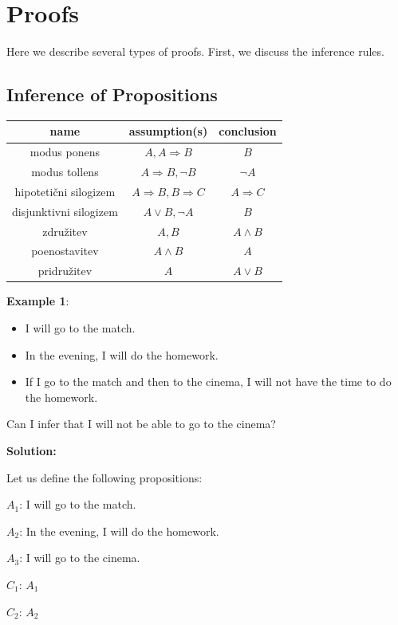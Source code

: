 \documentclass[11pt,paper=b5,footinclude,headinclude]{scrbook} %
\theoremstyle{remark}
\theoremstyle{definition} %
\theoremstyle{theorem} %
\begin{document}
\section{Proofs}
Here we describe several types of proofs. First, we discuss the inference rules.

\subsection*{Inference of Propositions}

\begin{center}
\begin{tabular}{|c|c|c|}
	\hline 
	name & assumption(s) & conclusion\\
	\hline 
	\hline 
	modus ponens & $A,A\Rightarrow B$ & $B$\\
	\hline 
	modus tollens & $A\Rightarrow B,\neg B$ & $\neg A$\\
	\hline 
	hipoteti\v{c}ni silogizem & $A\Rightarrow B,B\Rightarrow C$ & $A\Rightarrow C$\\
	\hline 
	disjunktivni silogizem & $A\vee B,\neg A$ & $B$\\
	\hline 
	združitev  & $A,B$ & $A\wedge B$\\
	\hline 
	poenostavitev & $A\wedge B$ & $A$\\
	\hline 
	pridružitev & $A$ & $A\vee B$\\
	\hline 
\end{tabular}
\end{center}

\textbf{Example 1}:
\begin{itemize}
	\item I will go to the match.
	\item In the evening, I will do the homework.
	\item If I go to the match and then to the cinema, I will not have the time to do the homework.
\end{itemize}
Can I infer that I will not be able to go to the cinema?

\medskip
\textbf{ Solution:}

Let us define the following propositions:

$A_1$: I will go to the match.

$A_2$: In the evening, I will do the homework.

$A_3$: I will go to the cinema.

$C_1$: $A_1$

$C_2$: $A_2$
\end{document}
